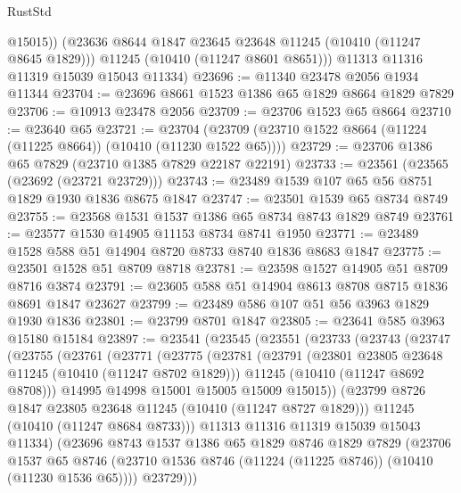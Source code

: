 \begin{lexlean}{RustStd}
\begin{coremodule}
            @15015))
        (@23636 @8644 @1847 @23645 @23648 @11245 (@10410 (@11247 @8645 @1829)))
        @11245
        (@10410 (@11247 @8601 @8651)))
      @11313
      @11316
      @11319
      @15039
      @15043
      @11334)
@23696 := @11340 @23478 @2056 @1934 @11344
@23704 := @23696 @8661 @1523 @1386 @65 @1829 @8664 @1829 @7829
@23706 := @10913 @23478 @2056
@23709 := @23706 @1523 @65 @8664
@23710 := @23640 @65
@23721 := @23704 (@23709 (@23710 @1522 @8664 (@11224 (@11225 @8664)) (@10410 (@11230 @1522 @65))))
@23729 := @23706 @1386 @65 @7829 (@23710 @1385 @7829 @22187 @22191)
@23733 := @23561 (@23565 (@23692 (@23721 @23729)))
@23743 := @23489 @1539 @107 @65 @56 @8751 @1829 @1930 @1836 @8675 @1847
@23747 := @23501 @1539 @65 @8734 @8749
@23755 := @23568 @1531 @1537 @1386 @65 @8734 @8743 @1829 @8749
@23761 := @23577 @1530 @14905 @11153 @8734 @8741 @1950
@23771 := @23489 @1528 @588 @51 @14904 @8720 @8733 @8740 @1836 @8683 @1847
@23775 := @23501 @1528 @51 @8709 @8718
@23781 := @23598 @1527 @14905 @51 @8709 @8716 @3874
@23791 := @23605 @588 @51 @14904 @8613 @8708 @8715 @1836 @8691 @1847 @23627
@23799 := @23489 @586 @107 @51 @56 @3963 @1829 @1930 @1836
@23801 := @23799 @8701 @1847
@23805 := @23641 @585 @3963 @15180 @15184
@23897 := @23541
    (@23545
      (@23551
        (@23733
          (@23743
            (@23747
              (@23755
                (@23761
                  (@23771
                    (@23775
                      (@23781
                        (@23791
                          (@23801 @23805 @23648 @11245 (@10410 (@11247 @8702 @1829)))
                          @11245
                          (@10410 (@11247 @8692 @8708)))
                        @14995
                        @14998
                        @15001
                        @15005
                        @15009
                        @15015))
                    (@23799 @8726 @1847 @23805 @23648 @11245 (@10410 (@11247 @8727 @1829)))
                    @11245
                    (@10410 (@11247 @8684 @8733)))
                  @11313
                  @11316
                  @11319
                  @15039
                  @15043
                  @11334)
                (@23696
                  @8743
                  @1537
                  @1386
                  @65
                  @1829
                  @8746
                  @1829
                  @7829
                  (@23706
                    @1537
                    @65
                    @8746
                    (@23710 @1536 @8746 (@11224 (@11225 @8746)) (@10410 (@11230 @1536 @65))))
                  @23729)))

\end{coremodule}
\end{lexlean}
